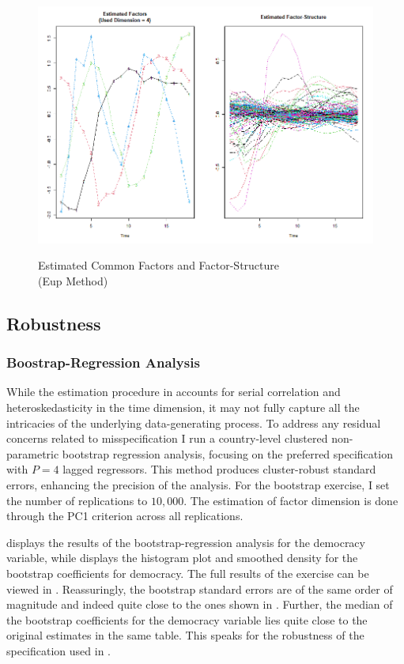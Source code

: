 \begin{figure}[htb]
  \caption{Estimated Common Factors and Factor-Structure \\
  (\ac{Eup} Method)}
  \centering
  \includegraphics[width=\textwidth]{Images/eup_factors_reduced.png}
  \label{fig:image1}
\end{figure}


\subsection{Robustness}

\subsubsection{Boostrap-Regression Analysis}

While the estimation procedure in  accounts for serial correlation and heteroskedasticity in the time dimension, it may not fully capture all the intricacies of the underlying data-generating process. To address any residual concerns related to misspecification I run a country-level clustered non-parametric bootstrap regression analysis, focusing on the preferred specification with $P = 4$ lagged regressors. This method produces cluster-robust standard errors, enhancing the precision of the analysis. For the bootstrap exercise, I set the number of replications to $10,000$. The estimation of factor dimension is done through the PC1 criterion across all replications. 

 displays the results of the bootstrap-regression analysis for the democracy variable, while  displays the histogram plot and smoothed density for the bootstrap coefficients for democracy.  The full results of the exercise can be viewed in .  Reassuringly, the bootstrap standard errors are of the same order of magnitude and indeed quite close to the ones shown in . Further, the median of the bootstrap coefficients for the democracy variable lies quite close to the original estimates in the same table.
This speaks for the robustness of the specification used in . 


